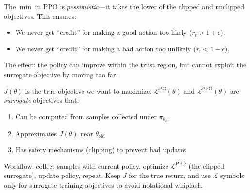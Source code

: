 \begin{remark}
    The $\min$ in PPO is \emph{pessimistic}---it takes the lower of the clipped and unclipped objectives. This ensures:
    \begin{itemize}
        \item We never get ``credit'' for making a good action too likely ($r_t > 1+\epsilon$).
        \item We never get ``credit'' for making a bad action too unlikely ($r_t < 1-\epsilon$).
    \end{itemize}
    The effect: the policy can improve within the trust region, but cannot exploit the surrogate objective by moving too far.
\end{remark}

\begin{remark}
    $J(\theta)$ is the true objective we want to maximize. $\mathcal{L}^{\text{PG}}(\theta)$ and $\mathcal{L}^{\text{PPO}}(\theta)$ are \emph{surrogate} objectives that:
    \begin{enumerate}
        \item Can be computed from samples collected under $\pi_{\theta_{\text{old}}}$
        \item Approximates $J(\theta)$ near $\theta_{\text{old}}$
        \item Has safety mechanisms (clipping) to prevent bad updates
    \end{enumerate}
    Workflow: collect samples with current policy, optimize $\mathcal{L}^{\text{PPO}}$ (the clipped surrogate), update policy, repeat. Keep $J$ for the true return, and use $\mathcal{L}$ symbols only for surrogate training objectives to avoid notational whiplash.
\end{remark}

